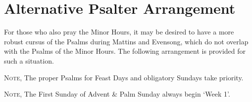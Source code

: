 \fancyhead[RE,LO]{}
\section{Alternative Psalter Arrangement}
\begin{secrubric}
	For those who also pray the Minor Hours, it may be desired to have a more robust cursus of the Psalms during Mattins and Evensong, which do not overlap with the Psalms of the Minor Hours. The following arrangement is provided for such a situation.
\end{secrubric}
\begin{rubric}
		\textsc{Note,} The proper Psalms for Feast Days and obligatory Sundays take priority.
\end{rubric}
\begin{rubric}
	\textsc{Note,} The First Sunday of Advent \& Palm Sunday always begin `Week 1'.
\end{rubric}


